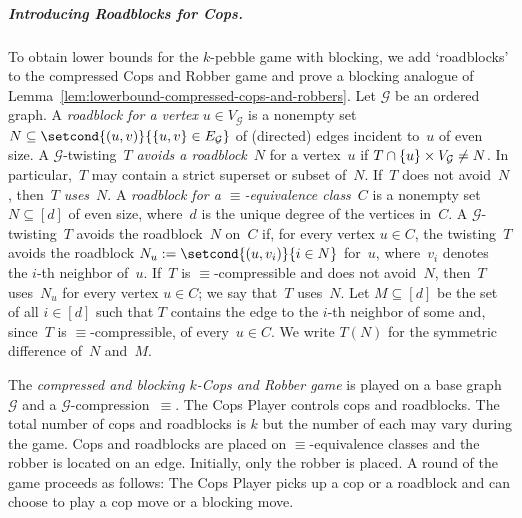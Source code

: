 \documentclass[10pt,a4paper]{article}
\newcommand{\defining}[1]{\emph{#1}}
\DeclarePairedDelimiter\set{\lbrace}{\rbrace}
\newcommand{\comp}{\equiv}
\newcommand{\graphG}{\mathcal{G}}
\newcommand{\vertexG}{V_{\graphG}}
\newcommand{\edgeG}{E_{\graphG}}
\begin{document}
\subparagraph*{Introducing Roadblocks for Cops.}
To obtain lower bounds for the $k$-pebble game with blocking,
we add `roadblocks' to the compressed Cops and Robber game
and prove a blocking  analogue of Lemma~\ref{lem:lowerbound-compressed-cops-and-robbers}.
Let $\graphG$ be an ordered graph.
A \defining{roadblock for a vertex} $u \in \vertexG$
is a nonempty set $N \subseteq \setcond{(u,v)}{\set{u,v} \in \edgeG}$ of (directed) edges incident to~$u$ of even size.
A $\graphG$-twisting~$T$ \defining{avoids a roadblock}~$N$ for a vertex~$u$
if $T\cap \set{u}\times \vertexG \neq N$.
In particular,~$T$ may contain a strict superset or subset of~$N$.
If~$T$ does not avoid~$N$, then~$T$ \defining{uses}~$N$. 
A \defining{roadblock for a $\comp$-equivalence class}~$C$ is a nonempty 
set~$N \subseteq [d]$ of even size, where~$d$ is the unique degree of the vertices in~$C$.
A $\graphG$-twisting~$T$ avoids the roadblock~$N$ on~$C$
if, for every vertex $u \in C$, 
the twisting~$T$ avoids the roadblock
$N_u := \setcond{(u,v_i)}{i \in N}$ for~$u$, where~$v_i$ denotes the $i$-th neighbor of~$u$.
If~$T$ is $\comp$-compressible and does not avoid~$N$,
then~$T$ uses~$N_u$ for every vertex $u \in C$;
we say that~$T$ uses~$N$.
Let $M \subseteq [d]$ be the set of all $i \in [d]$ such that $T$ contains the edge to the $i$-th neighbor of some and, since~$T$ is $\comp$-compressible, of every~$u \in C$.
We write $T(N)$ for the symmetric difference of~$N$ and~$M$.


The \defining{compressed and blocking $k$-Cops and Robber game}
is played on a base graph~$\graphG$ and a $\graphG$-compression~$\comp$.
The Cops Player controls cops and roadblocks.
The total number of cops and roadblocks is $k$ but the number of each may vary during the game.
Cops and roadblocks are placed on $\comp$-equivalence classes
and the robber is located on an edge.
Initially, only the robber is placed.
A round of the game proceeds as follows:
The Cops Player picks up a cop or a roadblock and can choose to play a cop move or a blocking move.
\end{document}
